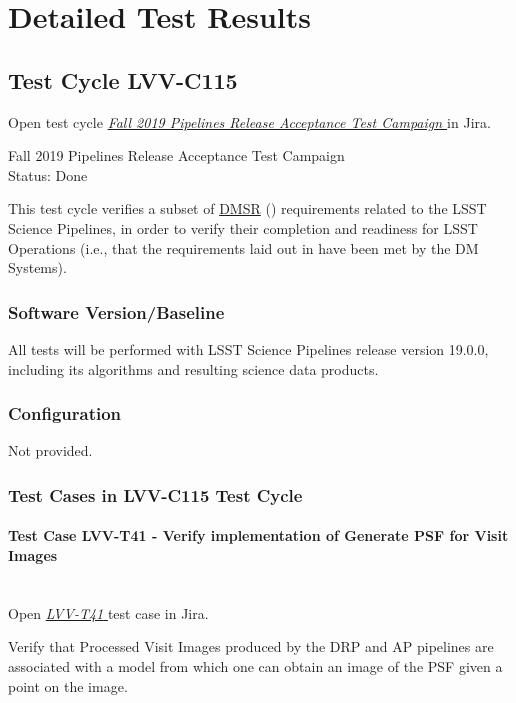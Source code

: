 \documentclass[DM,STR,toc]{lsstdoc}
\begin{document}
\newpage
\section{Detailed Test Results}
\label{sect:detailedtestresults}

\subsection{Test Cycle LVV-C115 }

Open test cycle {\it \href{https://jira.lsstcorp.org/secure/Tests.jspa#/testrun/LVV-C115}{ Fall 2019 Pipelines Release Acceptance Test Campaign
}} in Jira.

 Fall 2019 Pipelines Release Acceptance Test Campaign
\\
Status: Done

 This test cycle verifies a subset of
\href{https://lse-61.lsst.io/}{DMSR} () requirements related to
the LSST Science Pipelines, in order to verify their completion and
readiness for LSST Operations (i.e., that the requirements laid out in
 have been met by the DM Systems).


\subsubsection{Software Version/Baseline}
 All tests will be performed with LSST Science Pipelines release version
19.0.0, including its algorithms and resulting science data products.~


\subsubsection{Configuration}
Not provided.

\subsubsection{Test Cases in LVV-C115 Test Cycle}

\paragraph{Test Case LVV-T41 -  Verify implementation of Generate PSF for Visit Images
 }\mbox{}\\

Open  \href{https://jira.lsstcorp.org/secure/Tests.jspa#/testCase/LVV-T41}{\textit{ LVV-T41 } }
test case in Jira.

 Verify that Processed Visit Images produced by the DRP and AP pipelines
are associated with a model from which one can obtain an image of the
PSF given a point on the image.
\end{document}
